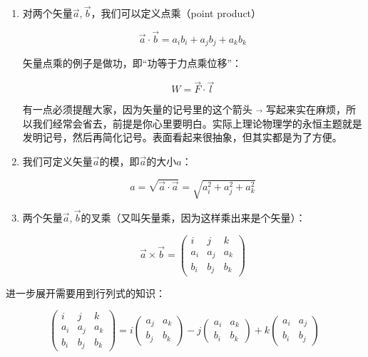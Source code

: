 \begin{enumerate}

\item 

对两个矢量$\vec a, \vec b$，我们可以定义点乘（point product）

\begin{equation}
\vec a \cdot \vec b = a_i b_i + a_j b_j + a_k b_k~
\end{equation}

矢量点乘的例子是做功，即“功等于力点乘位移”：

\begin{equation}
W = \vec F \cdot \vec l~
\end{equation}

有一点必须提醒大家，因为矢量的记号里的这个箭头 \quad  $\vec {}$ \quad 写起来实在麻烦，所以我们经常会省去，前提是你心里要明白。实际上理论物理学的永恒主题就是发明记号，然后再简化记号。表面看起来很抽象，但其实都是为了方便。

\item

我们可定义矢量$\vec a$的模，即$\vec a$的大小$a$：

\begin{equation}
a = \sqrt{ \vec a \cdot \vec a } = \sqrt{ a_i^2 + a_j^2 + a_k^2 }~
\end{equation}

\item

两个矢量$\vec a, \vec b$的叉乘（又叫矢量乘，因为这样乘出来是个矢量）：

\begin{equation}
\vec a \times \vec b = 
\left(  
\begin{array} {lcr}i & j & k \\a_i & a_j & a_k \\b_i & b_j & b_k
\end{array}
\right)~
\end{equation}

\end{enumerate}

进一步展开需要用到行列式的知识：

\begin{equation}
\left(  
\begin{array} {lcr}
i & j & k \\
a_i & a_j & a_k \\
b_i & b_j & b_k 
\end{array}
\right)
= i 
\left(  
\begin{array} {lcr}
 a_j & a_k \\
 b_j & b_k 
\end{array}
\right)
- j
\left(  
\begin{array} {lcr}
 a_i & a_k \\
 b_i & b_k 
\end{array}
\right)
+ k
\left(  
\begin{array} {lcr}
 a_i & a_j \\
 b_i & b_j 
\end{array}
\right)~
\end{equation}

